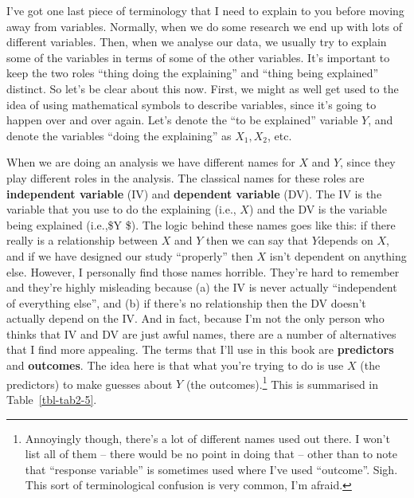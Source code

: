 \documentclass[
  letterpaper,
]{book}
\begin{document}
I've got one last piece of terminology that I need to explain to you
before moving away from variables. Normally, when we do some research we
end up with lots of different variables. Then, when we analyse our data,
we usually try to explain some of the variables in terms of some of the
other variables. It's important to keep the two roles ``thing doing the
explaining'' and ``thing being explained'' distinct. So let's be clear
about this now. First, we might as well get used to the idea of using
mathematical symbols to describe variables, since it's going to happen
over and over again. Let's denote the ``to be explained'' variable
\(Y\), and denote the variables ``doing the explaining'' as
\(X_1 , X_2\), etc.

When we are doing an analysis we have different names for \(X\) and
\(Y\), since they play different roles in the analysis. The classical
names for these roles are \textbf{independent variable} (IV) and
\textbf{dependent variable} (DV). The IV is the variable that you use to
do the explaining (i.e., \(X\)) and the DV is the variable being
explained (i.e.,\$Y \$). The logic behind these names goes like this: if
there really is a relationship between \(X\) and \(Y\) then we can say
that \(Y\)depends on \(X\), and if we have designed our study
``properly'' then \(X\) isn't dependent on anything else. However, I
personally find those names horrible. They're hard to remember and
they're highly misleading because (a) the IV is never actually
``independent of everything else'', and (b) if there's no relationship
then the DV doesn't actually depend on the IV. And in fact, because I'm
not the only person who thinks that IV and DV are just awful names,
there are a number of alternatives that I find more appealing. The terms
that I'll use in this book are \textbf{predictors} and
\textbf{outcomes}. The idea here is that what you're trying to do is use
\(X\) (the predictors) to make guesses about \(Y\) (the
outcomes).\footnote{Annoyingly though, there's a lot of different names
  used out there. I won't list all of them -- there would be no point in
  doing that -- other than to note that ``response variable'' is
  sometimes used where I've used ``outcome''. Sigh. This sort of
  terminological confusion is very common, I'm afraid.} This is
summarised in Table~\ref{tbl-tab2-5}.

\hypertarget{tbl-tab2-5}{}
 
  \providecommand{\huxb}[2]{\arrayrulecolor[RGB]{#1}\global\arrayrulewidth=#2pt}
  \providecommand{\huxvb}[2]{\color[RGB]{#1}\vrule width #2pt}
  \providecommand{\huxtpad}[1]{\rule{0pt}{#1}}
  \providecommand{\huxbpad}[1]{\rule[-#1]{0pt}{#1}}
\end{document}
